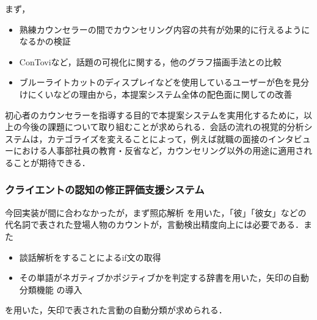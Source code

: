 \documentclass[shuuron]{kuee}
\begin{document}
まず，

\begin{itemize}
  \item 熟練カウンセラーの間でカウンセリング内容の共有が効果的に行えるようになるかの検証
  \item ConTovi\cite{el2016contovi}など，話題の可視化に関する，他のグラフ描画手法との比較
  \item ブルーライトカットのディスプレイなどを使用しているユーザーが色を見分けにくいなどの理由から，本提案システム全体の配色面に関しての改善
\end{itemize}

初心者のカウンセラーを指導する目的で本提案システムを実用化するために，以上の今後の課題について取り組むことが求められる．会話の流れの視覚的分析システムは，カテゴライズを変えることによって，例えば就職の面接のインタビューにおける人事部社員の教育・反省など，カウンセリング以外の用途に適用されることが期待できる．%

\subsubsection{クライエントの認知の修正評価支援システム}

今回実装が間に合わなかったが，まず照応解析\cite{sasano2009probabilistic} \cite{sasano2011discriminative}を用いた，「彼」「彼女」などの代名詞で表された登場人物のカウントが，言動検出精度向上には必要である．また
\begin{itemize}
  \item 談話解析をすることによるif文の取得\cite{kishimoto}
  \item その単語がネガティブかポジティブかを判定する辞書を用いた，矢印の自動分類機能\cite{小林のぞみ2005意見抽出のための評価表現の収集} \cite{東山昌彦2008述語の選択選好性に着目した名詞評価極性の獲得} の導入
\end{itemize}
を用いた，矢印で表された言動の自動分類が求められる．
\end{document}
